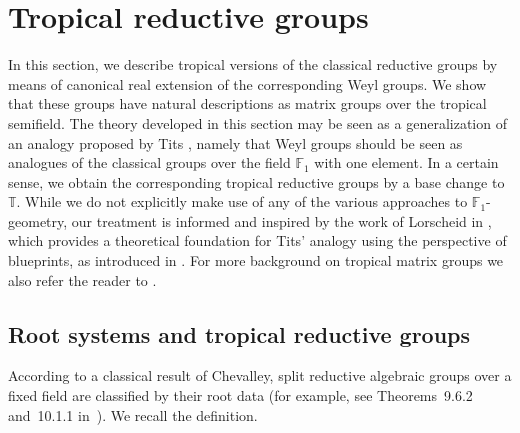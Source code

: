 \documentclass[10pt, a4paper]{amsart}
\theoremstyle{definition}
\theoremstyle{myitemstyle}
\newcommand{\TT}{\mathbb{T}}
\begin{document}
\section{Tropical reductive groups} \label{sec:reductivegroups}

In this section, we describe tropical versions of the classical reductive groups by means of canonical real extension of the corresponding Weyl groups. We show that these groups have natural descriptions as matrix groups over the tropical semifield. The theory developed in this section may be seen as a generalization of an analogy proposed by Tits \cite{Tits_analogy}, namely that Weyl groups should be seen as analogues of the classical groups over the field $\mathbb{F}_1$ with one element. In a certain sense, we obtain the corresponding tropical reductive groups by a base change to $\TT$. While we do not explicitly make use of any of the various approaches to $\mathbb{F}_1$-geometry, our treatment is informed and inspired by the work of Lorscheid in \cite{Lorscheid_blueprintsII}, which provides a theoretical foundation for Tits' analogy using the perspective of blueprints, as introduced in \cite{Lorscheid_blueprintsI}. For more background on tropical matrix groups we also refer the reader to \cite{IJK_tropicalmatrixgroups}.

\subsection{Root systems and tropical reductive groups} 
According to a classical result of Chevalley, split reductive algebraic groups over a fixed field are classified by their root data (for example, see Theorems~9.6.2 and~10.1.1 in~\cite{Springer_linalggroups}). We recall the definition.
\end{document}
